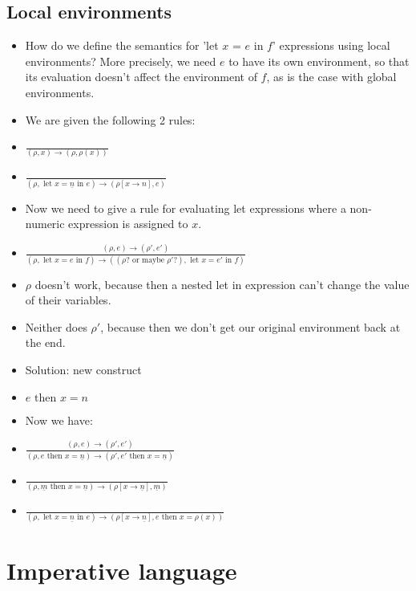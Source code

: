 \documentclass{article}
\begin{document}
\subsection{Local environments}
\begin{itemize}
	\item How do we define the semantics for 'let $x$ = $e$ in $f$' expressions using local environments? More precisely, we need $e$ to have its own environment, so that its evaluation doesn't affect the environment of $f$, as is the case with global environments.
	\item We are given the following 2 rules:
	\item $\frac{}{ (\rho, x)\rightarrow(\rho, \rho(x)) }$
	\item $\frac{}{(\rho, \text{ let }x = \underline{n}\text{ in }e)\rightarrow(\rho[x\rightarrow n], e) }$
	\item Now we need to give a rule for evaluating let expressions where a non-numeric expression is assigned to $x$.
	\item $\frac{ (\rho, e)\rightarrow(\rho', e') }
	{ (\rho, \text{ let }x = e\text{ in }f)\rightarrow((\rho?\text{ or maybe }\rho'?), \text{ let } x = e'\text{ in }f) }$
	\item $ \rho $ doesn't work, because then a nested let in expression can't change the value of their variables.
	\item Neither does $ \rho' $, because then we don't get our original environment back at the end.
	\item Solution: new construct
	\item $ e \text{ then }x=n $
	\item Now we have:
	\item $\frac{ (\rho, e)\rightarrow(\rho', e') }
	{ (\rho, e\text{ then }x = \underline{n})\rightarrow(\rho', e'\text{ then } x=\underline{n}) }$
	\item $\frac{}{ (\rho, \underline m\text{ then }x=\underline{n})\rightarrow(\rho[x\rightarrow \underline{n}], \underline{m}) }$
	\item $\frac{}{(\rho, \text{ let }x = \underline{n}\text{ in }e)\rightarrow(\rho[x\rightarrow \underline{n}], e\text{ then }x=\rho(x)) }$
\end{itemize}
\section{Imperative language}
\end{document}
